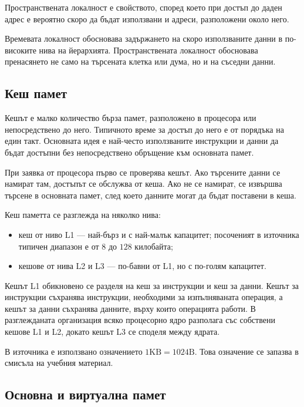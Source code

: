 \begin{defn}
Пространствената локалност е свойството, според което при достъп до даден адрес е вероятно скоро да бъдат използвани и адреси, разположени около него.
\end{defn}

Времевата локалност обосновава задържането на скоро използваните данни в по-високите нива на йерархията. Пространствената локалност обосновава пренасянето не само на търсената клетка или дума, но и на съседни данни.

\subsection{Кеш памет}\label{s:10.1.3}

Кешът е малко количество бърза памет, разположено в процесора или непосредствено до него. Типичното време за достъп до него е от порядъка на един такт. Основната идея е най-често използваните инструкции и данни да бъдат достъпни без непосредствено обръщение към основната памет.

При заявка от процесора първо се проверява кешът. Ако търсените данни се намират там, достъпът се обслужва от кеша. Ако не се намират, се извършва търсене в основната памет, след което данните могат да бъдат поставени в кеша.

Кеш паметта се разглежда на няколко нива:

\begin{itemize}
    \item кеш от ниво L1 --- най-бърз и с най-малък капацитет; посоченият в източника типичен диапазон е от $8$ до $128$ килобайта;
    \item кешове от нива L2 и L3 --- по-бавни от L1, но с по-голям капацитет.
\end{itemize}

Кешът L1 обикновено се разделя на кеш за инструкции и кеш за данни. Кешът за инструкции съхранява инструкции, необходими за изпълняваната операция, а кешът за данни съхранява данните, върху които операцията работи. В разглежданата организация всяко процесорно ядро разполага със собствени кешове L1 и L2, докато кешът L3 се споделя между ядрата.

\begin{remark}
В източника е използвано означението $1\mathrm{KB}=1024\mathrm{B}$. Това означение се запазва в смисъла на учебния материал.
\end{remark}

\subsection{Основна и виртуална памет}\label{s:10.1.4}

